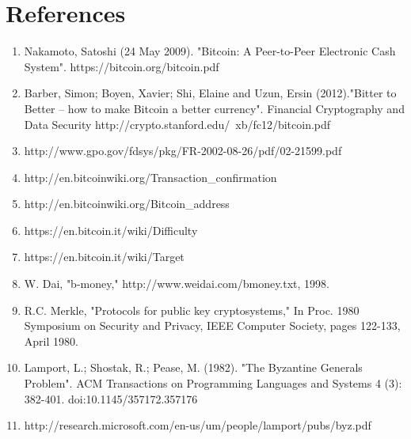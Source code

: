 \documentclass[pdftex,11pt]{article}
\begin{document}
\section{References}

\begin{enumerate}
\item Nakamoto, Satoshi (24 May 2009). "Bitcoin: A Peer-to-Peer Electronic Cash System". https://bitcoin.org/bitcoin.pdf

\item Barber, Simon; Boyen, Xavier; Shi, Elaine and Uzun, Ersin (2012)."Bitter to Better -- how to make Bitcoin a better currency". Financial Cryptography and Data Security http://crypto.stanford.edu/~xb/fc12/bitcoin.pdf

\item http://www.gpo.gov/fdsys/pkg/FR-2002-08-26/pdf/02-21599.pdf

\item http://en.bitcoinwiki.org/Transaction\_confirmation
\item http://en.bitcoinwiki.org/Bitcoin\_address
\item https://en.bitcoin.it/wiki/Difficulty
\item https://en.bitcoin.it/wiki/Target
\item W. Dai, "b-money," http://www.weidai.com/bmoney.txt, 1998.
\item R.C. Merkle, "Protocols for public key cryptosystems," In Proc. 1980 Symposium on Security and Privacy, IEEE Computer Society, pages 122-133, April 1980.
\item Lamport, L.; Shostak, R.; Pease, M. (1982). "The Byzantine Generals Problem". ACM Transactions on Programming Languages and Systems 4 (3): 382-401. doi:10.1145/357172.357176
\item http://research.microsoft.com/en-us/um/people/lamport/pubs/byz.pdf
\end{enumerate}
\end{document}
